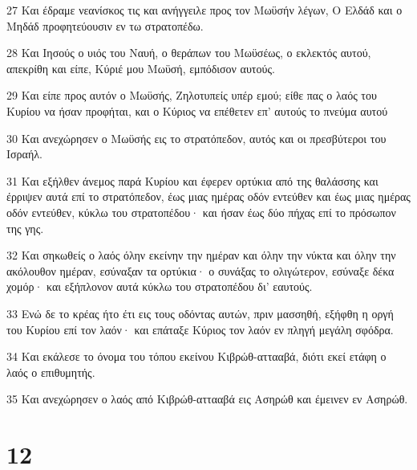 \par 27 Και έδραμε νεανίσκος τις και ανήγγειλε προς τον Μωϋσήν λέγων, Ο Ελδάδ και ο Μηδάδ προφητεύουσιν εν τω στρατοπέδω.
\par 28 Και Ιησούς ο υιός του Ναυή, ο θεράπων του Μωϋσέως, ο εκλεκτός αυτού, απεκρίθη και είπε, Κύριέ μου Μωϋσή, εμπόδισον αυτούς.
\par 29 Και είπε προς αυτόν ο Μωϋσής, Ζηλοτυπείς υπέρ εμού; είθε πας ο λαός του Κυρίου να ήσαν προφήται, και ο Κύριος να επέθετεν επ' αυτούς το πνεύμα αυτού
\par 30 Και ανεχώρησεν ο Μωϋσής εις το στρατόπεδον, αυτός και οι πρεσβύτεροι του Ισραήλ.
\par 31 Και εξήλθεν άνεμος παρά Κυρίου και έφερεν ορτύκια από της θαλάσσης και έρριψεν αυτά επί το στρατόπεδον, έως μιας ημέρας οδόν εντεύθεν και έως μιας ημέρας οδόν εντεύθεν, κύκλω του στρατοπέδου· και ήσαν έως δύο πήχας επί το πρόσωπον της γης.
\par 32 Και σηκωθείς ο λαός όλην εκείνην την ημέραν και όλην την νύκτα και όλην την ακόλουθον ημέραν, εσύναξαν τα ορτύκια· ο συνάξας το ολιγώτερον, εσύναξε δέκα χομόρ· και εξήπλονον αυτά κύκλω του στρατοπέδου δι' εαυτούς.
\par 33 Ενώ δε το κρέας ήτο έτι εις τους οδόντας αυτών, πριν μασσηθή, εξήφθη η οργή του Κυρίου επί τον λαόν· και επάταξε Κύριος τον λαόν εν πληγή μεγάλη σφόδρα.
\par 34 Και εκάλεσε το όνομα του τόπου εκείνου Κιβρώθ-αττααβά, διότι εκεί ετάφη ο λαός ο επιθυμητής.
\par 35 Και ανεχώρησεν ο λαός από Κιβρώθ-αττααβά εις Ασηρώθ και έμεινεν εν Ασηρώθ.

\chapter{12}

